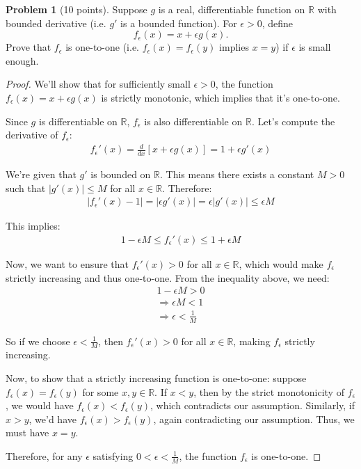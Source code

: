 \documentclass[12pt,oneside]{article}
\theoremstyle{definition}
\newtheorem{problem}{Problem}
\begin{document}
\begin{problem}[10 points]
Suppose $g$ is a real, differentiable function on $\mathbb{R}$ with bounded derivative (i.e. $g'$ is a bounded function). 
For $\epsilon > 0$, define
\[
f_{\epsilon} (x) = x + \epsilon g(x). 
\]
Prove that $f_{\epsilon}$ is one-to-one (i.e. $f_{\epsilon}(x) = f_{\epsilon}(y)$ implies $x = y$) if $\epsilon$ is small enough. 
\end{problem}

\begin{proof}
We'll show that for sufficiently small $\epsilon > 0$, the function $f_{\epsilon}(x) = x + \epsilon g(x)$ is strictly monotonic, which implies that it's one-to-one.

Since $g$ is differentiable on $\mathbb{R}$, $f_{\epsilon}$ is also differentiable on $\mathbb{R}$. Let's compute the derivative of $f_{\epsilon}$:
\begin{align}
f_{\epsilon}'(x) = \frac{d}{dx}[x + \epsilon g(x)] = 1 + \epsilon g'(x)
\end{align}

We're given that $g'$ is bounded on $\mathbb{R}$. This means there exists a constant $M > 0$ such that $|g'(x)| \leq M$ for all $x \in \mathbb{R}$. Therefore:
\begin{align}
|f_{\epsilon}'(x) - 1| = |\epsilon g'(x)| = \epsilon |g'(x)| \leq \epsilon M
\end{align}

This implies:
\begin{align}
1 - \epsilon M \leq f_{\epsilon}'(x) \leq 1 + \epsilon M
\end{align}

Now, we want to ensure that $f_{\epsilon}'(x) > 0$ for all $x \in \mathbb{R}$, which would make $f_{\epsilon}$ strictly increasing and thus one-to-one. From the inequality above, we need:
\begin{align}
1 - \epsilon M > 0 \\
\Rightarrow \epsilon M < 1 \\
\Rightarrow \epsilon < \frac{1}{M}
\end{align}

So if we choose $\epsilon < \frac{1}{M}$, then $f_{\epsilon}'(x) > 0$ for all $x \in \mathbb{R}$, making $f_{\epsilon}$ strictly increasing.

Now, to show that a strictly increasing function is one-to-one: suppose $f_{\epsilon}(x) = f_{\epsilon}(y)$ for some $x, y \in \mathbb{R}$. If $x < y$, then by the strict monotonicity of $f_{\epsilon}$, we would have $f_{\epsilon}(x) < f_{\epsilon}(y)$, which contradicts our assumption. Similarly, if $x > y$, we'd have $f_{\epsilon}(x) > f_{\epsilon}(y)$, again contradicting our assumption. Thus, we must have $x = y$.

Therefore, for any $\epsilon$ satisfying $0 < \epsilon < \frac{1}{M}$, the function $f_{\epsilon}$ is one-to-one.
\end{proof}
\end{document}
